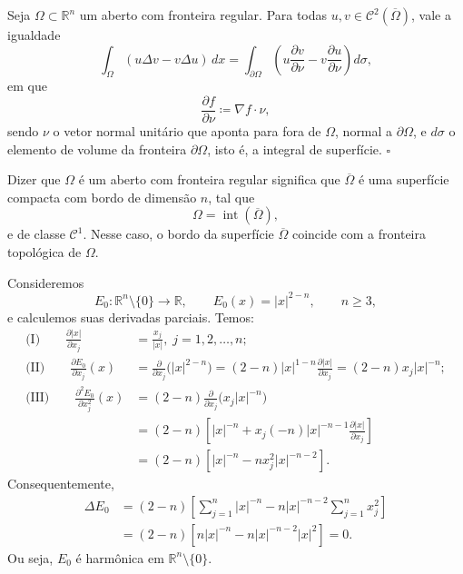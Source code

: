 \documentclass[../distribution_theory_notes.tex]{subfiles}
\begin{document}
\begin{lemma*}
	Seja \(\Omega\subset\mathbb{R}^{n}\) um aberto com fronteira regular. Para todas \(u,v\in\mathcal{C}^{2}(\overline{\Omega})\), vale a igualdade
	\[
		\int_{\Omega}(u\Delta v-v\Delta u)\,dx
		=
		\int_{\partial\Omega}
		\left(
		u\frac{\partial v}{\partial\nu}
		-v\frac{\partial u}{\partial\nu}
		\right)d\sigma,
	\]
	em que
	\[
		\frac{\partial f}{\partial\nu}\coloneqq\nabla f\cdot\nu,
	\]
	sendo \(\nu\) o vetor normal unitário que aponta para fora de \(\Omega\), normal a \(\partial\Omega\), e \(d\sigma\) o elemento de volume da fronteira \(\partial\Omega\), isto é, a integral de superfície. \(\square\)
\end{lemma*}

\begin{tcolorbox}[
		skin=enhanced,
		title=Observação,
		fonttitle=\bfseries,
		colframe=black,
		colbacktitle=cyan!75!white,
		colback=cyan!15,
		colbacklower=black,
		coltitle=black,
		drop fuzzy shadow,
	]
	Dizer que \(\Omega\) é um aberto com fronteira regular significa que \(\overline{\Omega}\) é uma superfície compacta com bordo de dimensão \(n\), tal que
	\[
		\Omega=\operatorname{int}(\overline{\Omega}),
	\]
	e de classe \(\mathcal{C}^{1}\). Nesse caso, o bordo da superfície \(\overline{\Omega}\) coincide com a fronteira topológica de \(\Omega\).
\end{tcolorbox}

Consideremos
\[
	E_{0}:\mathbb{R}^{n}\setminus\{0\}\longrightarrow\mathbb{R},
	\qquad
	E_{0}(x)=|x|^{2-n},
	\qquad n\geq 3,
\]
e calculemos suas derivadas parciais. Temos:
\begin{align*}
	\text{(I)}\qquad
	\frac{\partial |x|}{\partial x_{j}}
	 & =\frac{x_{j}}{|x|},\; j=1,2,\ldots,n;                                              \\[0.4em]
	\text{(II)}\qquad
	\frac{\partial E_{0}}{\partial x_{j}}(x)
	 & =\frac{\partial}{\partial x_{j}}\bigl(|x|^{2-n}\bigr)
	=(2-n)|x|^{1-n}\frac{\partial |x|}{\partial x_{j}}
	=(2-n)x_{j}|x|^{-n};                                                                  \\[0.4em]
	\text{(III)}\qquad
	\frac{\partial^{2}E_{0}}{\partial x_{j}^{2}}(x)
	 & =(2-n)\frac{\partial}{\partial x_{j}}\bigl(x_{j}|x|^{-n}\bigr)                     \\
	 & =(2-n)\left[|x|^{-n}+x_{j}(-n)|x|^{-n-1}\frac{\partial |x|}{\partial x_{j}}\right] \\
	 & =(2-n)\left[|x|^{-n}-n x_{j}^{2}|x|^{-n-2}\right].
\end{align*}
Consequentemente,
\begin{align*}
	\Delta E_{0}
	 & =(2-n)\left[
		\sum\limits_{j=1}^{n}|x|^{-n}
		-n|x|^{-n-2}\sum\limits_{j=1}^{n}x_{j}^{2}
	\right]                                               \\
	 & =(2-n)\left[n|x|^{-n}-n|x|^{-n-2}|x|^{2}\right]=0.
\end{align*}
Ou seja, \(E_{0}\) é harmônica em \(\mathbb{R}^{n}\setminus\{0\}\).
\end{document}
